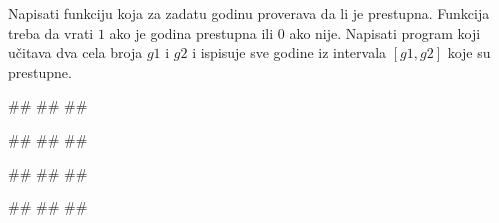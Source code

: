 \begin{Exercise}[label=p1.4_07] 
Napisati funkciju  koja za zadatu
godinu proverava da li je prestupna. Funkcija treba da vrati $1$ ako
je godina prestupna ili $0$ ako nije. Napisati program koji učitava
dva cela broja $g1$ i $g2$ i ispisuje sve godine iz intervala $[g1,
  g2]$ koje su prestupne.
 
\begin{miditest}
\begin{upotreba}{1}
#\naslovInt#
##
##
\end{upotreba}
\end{miditest}
\begin{miditest}
\begin{upotreba}{2}
#\naslovInt#
##
##
\end{upotreba}
\end{miditest}

\begin{miditest}
\begin{upotreba}{3}
#\naslovInt#
##
##
\end{upotreba}
\end{miditest}
\begin{miditest}
\begin{upotreba}{4}
#\naslovInt#
##
##
\end{upotreba}
\end{miditest}
\end{Exercise}
\begin{Answer}[ref=p1.4_07]
\end{Answer}


